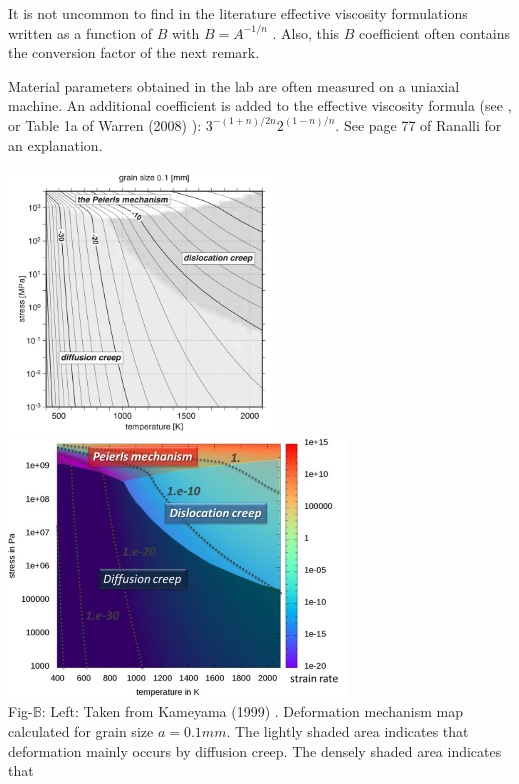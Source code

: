 \begin{remark}
It is not uncommon to find in the literature effective viscosity formulations written as a function 
of $B$ with $B=A^{-1/n}$ \cite{wabj08,wabj08b,wabj08c}. Also, this $B$ coefficient often contains the conversion 
factor of the next remark.
\end{remark}

\begin{remark} Material parameters obtained in the lab are often measured on a uniaxial machine. 
An additional coefficient is added to the effective viscosity formula (see \cite{grpy12,grpy13}, 
or Table 1a of Warren \etal (2008) \cite{wabj08}):
$3^{-(1+n)/2n}2^{(1-n)/n}$. See page 77 of Ranalli \cite{ranalli} for an explanation.
\end{remark}

\begin{center}
\includegraphics[width=7cm]{images/rheology/defmap}
\includegraphics[width=9cm]{images/rheology/elme18}\\
{\captionfont 
Fig-$\mathds{B}$: Left: Taken from Kameyama \etal (1999) \cite{kayk99}.
Deformation mechanism map calculated for grain size $a=0.1\si{mm}$. The lightly shaded area indicates 
that deformation mainly occurs by diffusion creep. The densely shaded area indicates that 
}
\end{center}
